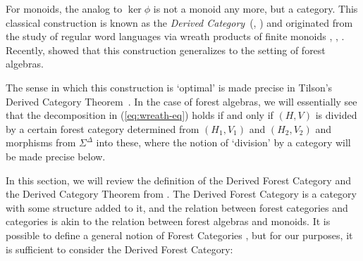 \documentclass[sigplan,9pt]{acmart}\settopmatter{printfolios=true,printccs=false,printacmref=false}
\theoremstyle{definition}
\begin{document}
For monoids, the analog to $\operatorname{ker} \phi$ is not a monoid any more, but a category.
This classical construction is known as the \emph{Derived Category}~(\cite{tilson-categories-1987}, \cite{rhodes-q-theory-2009}) and originated from the study of regular word languages via wreath products of finite monoids \cite{brzozowski-characterizations-1973}, \cite{therien-graph-1985}, \cite{straubing-finite-1985}.
Recently, \cite{straubing-forest-2018} showed that this construction generalizes to the setting of forest algebras.

The sense in which this construction is `optimal' is made precise in Tilson's Derived Category Theorem~\cite{tilson-categories-1987}.
In the case of forest algebras, we will essentially see that the decomposition in (\ref{eq:wreath-eq})
holds if and only if $(H,V)$ is divided by a certain forest category determined from $(H_1,V_1)$ and $(H_2,V_2)$ and morphisms from $\Sigma^\Delta$ into these, where the notion of `division' by a category will be made precise below.

In this section, we will review the definition of the Derived Forest Category and the Derived Category Theorem from \cite{straubing-forest-2018}.
The Derived Forest Category is a category with some structure added to it, and the relation between forest categories and categories is akin to the relation between forest algebras and monoids.
It is possible to define a general notion of Forest Categories \cite{straubing-forest-2018}, but for our purposes, it is sufficient to consider the Derived Forest Category:



%
%
%
%
%
%
\end{document}
